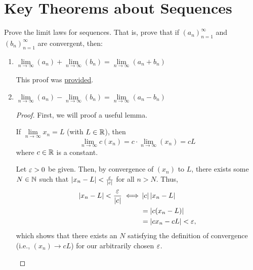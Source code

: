 \section{Key Theorems about Sequences}

\begin{problem}
Prove the limit laws for sequences. That is, prove that if
$(a_{n})_{n=1}^{\infty}$ and $(b_{n})_{n=1}^{\infty}$ are convergent, then:

  \begin{enumerate}[label=(\alph*)]
    \item $\lim\limits_{n \to \infty} {(a_{n})} + \lim\limits_{n \to \infty} {(b_{n})} = \lim\limits_{n \to \infty} {(a_{n} + b_{n})}$
      \label{prob:sum-limit-law}

      \begin{callout}
        This proof was \href{https://www.youtube.com/watch?v=Q7MzeAaL7bU&t=610s}{provided}.
      \end{callout}


    \item $\lim\limits_{n \to \infty} {(a_{n})} - \lim\limits_{n \to \infty} {(b_{n})} = \lim\limits_{n \to \infty} {(a_{n} - b_{n})}$

      \begin{proof}
        First, we will proof a useful lemma.

        \begin{lemma}
          \label{lem:constant-multiplication-limit-law}
          If $\lim\limits_{n \to \infty} x_{n} = L$ (with $L \in \mathbb{R}$), then 
          \[
            \lim\limits_{n \to \infty} c(x_{n}) = c \cdot \lim\limits_{n \to \infty} (x_{n}) = c L
          \]
          where $c \in \mathbb{R}$ is a constant.
        \end{lemma}

        \begin{subproof}
          Let $\varepsilon > 0$ be given. Then, by convergence of $(x_{n})$ to $L$, there exists
          some $N \in \mathbb{N}$ such that $\left\lvert x_{n} - L \right\rvert < \frac{\varepsilon}{\left\lvert c \right\rvert}$ for all $n > N$.
          Thus, 
          \begin{align*}
            \left\lvert x_{n} - L \right\rvert < \frac{\varepsilon}{\left\lvert c \right\rvert} \iff & \left\lvert c \right\rvert\left\lvert x_{n} - L \right\rvert \\
                                                        &= \left\lvert c(x_{n} - L) \right\rvert \\
                                                        &= \left\lvert cx_{n} - cL \right\rvert < \varepsilon,
          \end{align*}
          which shows that there exists an $N$ satisfying the definition of convergence (i.e., $(x_{n}) \to cL$) for our arbitrarily chosen $\varepsilon$.
        \end{subproof}


\end{proof}
\end{enumerate}
\end{problem}
